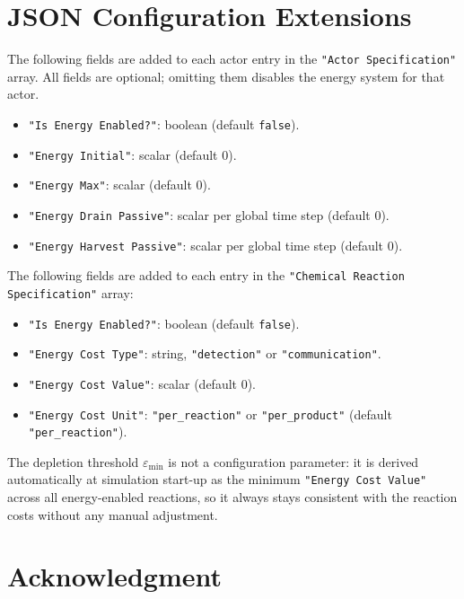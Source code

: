 \documentclass[journal]{IEEEtran}
\begin{document}
\appendices

\section{JSON Configuration Extensions}
\label{app:json}

The following fields are added to each actor entry in the
\texttt{"Actor Specification"} array. All fields are optional; omitting them
disables the energy system for that actor.

\begin{itemize}
  \item \texttt{"Is Energy Enabled?"}: boolean (default \texttt{false}).
  \item \texttt{"Energy Initial"}: scalar (default 0).
  \item \texttt{"Energy Max"}: scalar (default 0).
  \item \texttt{"Energy Drain Passive"}: scalar per global time step (default 0).
  \item \texttt{"Energy Harvest Passive"}: scalar per global time step (default 0).
\end{itemize}

The following fields are added to each entry in the
\texttt{"Chemical Reaction Specification"} array:

\begin{itemize}
  \item \texttt{"Is Energy Enabled?"}: boolean (default \texttt{false}).
  \item \texttt{"Energy Cost Type"}: string, \texttt{"detection"} or
        \texttt{"communication"}.
  \item \texttt{"Energy Cost Value"}: scalar (default 0).
  \item \texttt{"Energy Cost Unit"}: \texttt{"per\_reaction"} or
        \texttt{"per\_product"} (default \texttt{"per\_reaction"}).
\end{itemize}

The depletion threshold $\varepsilon_\mathrm{min}$ is not a configuration
parameter: it is derived automatically at simulation start-up as the minimum
\texttt{"Energy Cost Value"} across all energy-enabled reactions, so it
always stays consistent with the reaction costs without any manual adjustment.

\section*{Acknowledgment}
\end{document}
